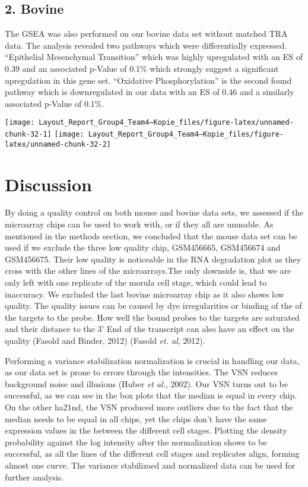 \documentclass[
  parskip,
  oneside]{scrreprt}
\begin{document}
\hypertarget{bovine-3}{%
\section{2. Bovine}\label{bovine-3}}

The GSEA was also performed on our bovine data set without matched TRA
data. The analysis revealed two pathways which were differentially
expressed. ``Epithelial Mesenchymal Transition'' which was highly
upregulated with an ES of 0.39 and an associated p-Value of 0.1\% which
strongly suggest a significant upregulation in this gene set.
``Oxidative Phosphorylation'' is the second found pathway which is
downregulated in our data with an ES of 0.46 and a similarly associated
p-Value of 0.1\%.

\texttt{[image: Layout\_Report\_Group4\_Team4---Kopie\_files/figure-latex/unnamed-chunk-32-1]}
\texttt{[image: Layout\_Report\_Group4\_Team4---Kopie\_files/figure-latex/unnamed-chunk-32-2]}

\hypertarget{discussion}{%
\chapter{Discussion}\label{discussion}}

By doing a quality control on both mouse and bovine data sets, we
assessed if the microarray chips can be used to work with, or if they
all are unusable. As mentioned in the methods section, we concluded that
the mouse data set can be used if we exclude the three low quality chip,
GSM456665, GSM456674 and GSM456675. Their low quality is noticeable in
the RNA degradation plot as they cross with the other lines of the
microarrays.The only downside is, that we are only left with one
replicate of the morula cell stage, which could lead to inaccuracy. We
excluded the last bovine microarray chip as it also shows low quality.
The quality issues can be caused by dye irregularities or binding of the
of the targets to the probe. How well the bound probes to the targets
are saturated and their distance to the 3' End of the transcript can
also have an effect on the quality (Fasold and Binder, 2012) (Fasold
\emph{et. al}, 2012).

Performing a variance stabilization normalization is crucial in handling
our data, as our data set is prone to errors through the intensities.
The VSN reduces background noise and illusions (Huber \emph{et al.},
2002). Our VSN turns out to be successful, as we can see in the box
plots that the median is equal in every chip. On the other ha21nd, the
VSN produced more outliers due to the fact that the median needs to be
equal in all chips, yet the chips don't have the same expression values
in the between the different cell stages. Plotting the density
probability against the log intensity after the normalization shows to
be successful, as all the lines of the different cell stages and
replicates align, forming almost one curve. The variance stabilizaed and
normalized data can be used for further analysis.
\end{document}
